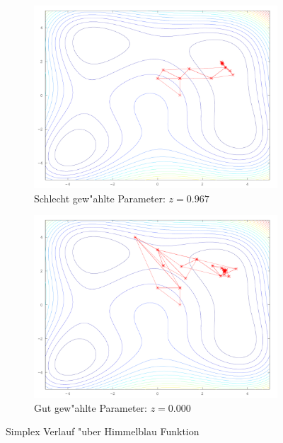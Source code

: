 \begin{figure}[htb]
\centering
\begin{subfigure}[b]{0.49\textwidth}
\centering
\includegraphics[width=\textwidth]{downhill/himmelblaubad.png}
\caption{Schlecht gew"ahlte Parameter: $z=0.967$}
\end{subfigure} \begin{subfigure}[b]{0.49\textwidth}
\centering
\includegraphics[width=\textwidth]{downhill/himmelblaugood.png}
\caption{Gut gew"ahlte Parameter: $z=0.000$}
\end{subfigure}

\caption{Simplex Verlauf "uber Himmelblau Funktion}
\label{fig:downhillHimmelblau}
\end{figure}
